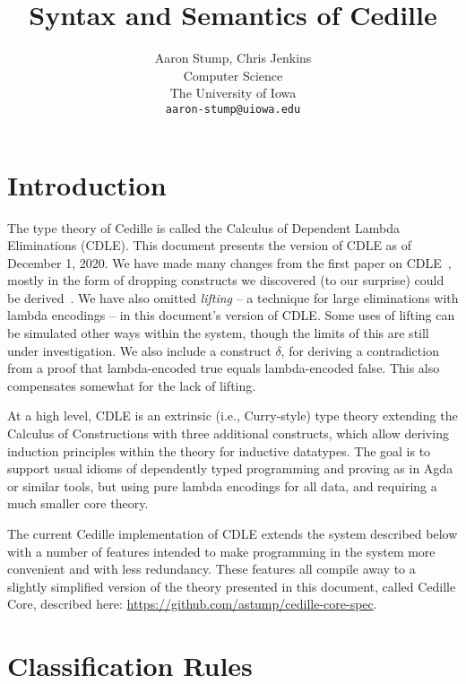 \documentclass{article}
\begin{document}
\title{Syntax and Semantics of Cedille}

\author{Aaron Stump, Chris Jenkins \\
  Computer Science \\
  The University of Iowa \\
\texttt{aaron-stump@uiowa.edu}}

\date{}

\maketitle

\section{Introduction}

The type theory of Cedille is called the Calculus of Dependent Lambda
Eliminations (CDLE).  This document presents the version of CDLE as of
December 1, 2020.  We have made many changes from the first paper on CDLE~\cite{stump17},
mostly in the form of dropping constructs we discovered (to our
surprise) could be derived~\cite{stump18}. We have also omitted
\emph{lifting} -- a technique for large eliminations with lambda
encodings -- in this document's version of CDLE.  Some uses of lifting
can be simulated other ways within the system, though the limits of
this are still under investigation.  We also include a construct
$\delta$, for deriving a contradiction from a proof that
lambda-encoded true equals lambda-encoded false.  This also
compensates somewhat for the lack of lifting.

At a high level, CDLE is an extrinsic (i.e., Curry-style) type theory
extending the Calculus of Constructions with three additional
constructs, which allow deriving induction principles within the
theory for inductive datatypes.  The goal is to support usual
idioms of dependently typed programming and proving as in Agda or
similar tools, but using pure lambda encodings for all data, and
requiring a much smaller core theory.

The current Cedille implementation of CDLE extends the system
described below with a number of features intended to make programming
in the system more convenient and with less redundancy.  These
features all compile away to a slightly simplified version of the
theory presented in this document, called Cedille Core, described
here: \url{https://github.com/astump/cedille-core-spec}.

\section{Classification Rules}
\end{document}
